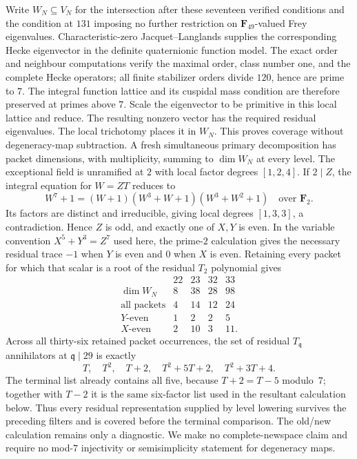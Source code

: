 \documentclass[11pt]{article}
\newcommand{\F}{\mathbf F}
\theoremstyle{definition}
\theoremstyle{remark}
\begin{document}
Write $W_N\subseteq V_N$ for the intersection after these seventeen verified
conditions and the condition at $131$ imposing no further restriction
on $\F_{49}$-valued Frey eigenvalues.  Characteristic-zero Jacquet--Langlands
\cite[Theorem~3.9 and \S4]{DembeleVoight} supplies the corresponding
Hecke eigenvector in the definite quaternionic function model.  The exact
order and neighbour computations verify the maximal order, class number
one, and the complete Hecke operators; all finite stabilizer orders divide
$120$, hence are prime to $7$.  The integral function lattice and its
cuspidal mass condition are therefore preserved at primes above $7$.
Scale the eigenvector to be primitive in this local lattice and reduce.
The resulting nonzero vector has the required residual eigenvalues.
The local trichotomy places it in $W_N$.  This proves coverage without
degeneracy-map subtraction.  A fresh simultaneous primary decomposition has
packet dimensions, with multiplicity, summing to $\dim W_N$ at every level.
The exceptional field is unramified at $2$ with local factor degrees
$[1,2,4]$.  If $2\mid Z$, the integral equation for $W=ZT$ reduces to
\[
 W^7+1=(W+1)(W^3+W+1)(W^3+W^2+1)\quad\text{over }\F_2.
\]
Its factors are distinct and irreducible, giving local degrees $[1,3,3]$,
a contradiction.  Hence $Z$ is odd, and exactly one of $X,Y$ is even.
In the variable convention $X^5+Y^3=Z^7$ used here, the prime-$2$
calculation gives the necessary residual trace $-1$ when $Y$ is even
and $0$ when $X$ is even.  Retaining every packet for which that scalar
is a root of the residual $T_2$ polynomial gives
\[
\begin{array}{c|rrrr}
 &22&23&32&33\\ \hline
 \dim W_N&8&38&28&98\\
 \text{all packets}&4&14&12&24\\
 Y\text{-even}&1&2&2&5\\
 X\text{-even}&2&10&3&11.
\end{array}
\]
Across all thirty-six retained packet occurrences, the set of residual
$T_{\mathfrak q}$ annihilators at $\mathfrak q\mid29$ is exactly
\[
 T,\quad T^2,\quad T+2,\quad T^2+5T+2,\quad T^2+3T+4.
\]
The terminal list already contains all five, because $T+2=T-5$ modulo~$7$;
together with $T-2$ it is the same six-factor list used in the resultant
calculation below.  Thus every residual representation supplied by level
lowering survives the preceding filters and is covered before the terminal
comparison.  The old/new calculation remains only a diagnostic.  We make no
complete-newspace claim and require no mod-$7$ injectivity or semisimplicity
statement for degeneracy maps.
\end{document}
